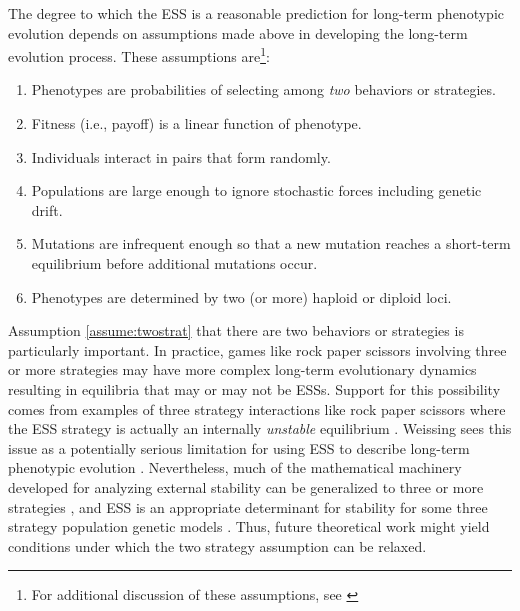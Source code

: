 \documentclass[11pt]{article}
\begin{document}
The degree to which the ESS is a reasonable prediction for long-term phenotypic evolution depends on assumptions made above in developing the long-term evolution process. These assumptions are\footnote{For additional discussion of these assumptions, see \cite{Eshel:1996,Hammerstein:1996,Weissing:1996}}:
\begin{enumerate}[nosep]
  \item Phenotypes are probabilities of selecting among \textit{two} behaviors or strategies. \label{assume:twostrat}
  \item Fitness (i.e., payoff) is a linear function of phenotype. \label{assume:linear}
  \item Individuals interact in pairs that form randomly. \label{assume:pairs}
  \item Populations are large enough to ignore stochastic forces including genetic drift. \label{assume:large-pop}
  \item Mutations are infrequent enough so that a new mutation reaches a short-term equilibrium before additional mutations occur. \label{assume:weak-mut}
  \item Phenotypes are determined by two (or more) haploid or diploid loci. \label{assume:ploidy}
\end{enumerate}
Assumption \ref{assume:twostrat} that there are two behaviors or strategies is particularly important. In practice, games like rock paper scissors \cite{Taylor:Jonker:1978,Zeeman:1980,Weissing:1991,Hofbauer:Sigmund:1998} involving three or more strategies may have more complex long-term evolutionary dynamics resulting in equilibria that may or may not be ESSs. Support for this possibility comes from examples of three strategy interactions like rock paper scissors where the ESS strategy is actually an internally \textit{unstable} equilibrium \cites{Friedman:1991,Weissing:1991}. Weissing sees this issue as a potentially serious limitation for using ESS to describe long-term phenotypic evolution \cite{Weissing:1996}.
Nevertheless, much of the mathematical machinery developed for analyzing external stability can be generalized to three or more strategies \cite[e.g.,][]{Eshel:Feldman:1984,Weissing:1996,Eshel:Feldman:1998,Hofbauer:Sigmund:1998}, and ESS is an appropriate determinant for stability for some three strategy population genetic models \cite[e.g., single-locus three-allele models in continuous time][]{Cressman:Hofbauer:1996}. Thus, future theoretical work might yield conditions under which the two strategy assumption can be relaxed.
\end{document}
